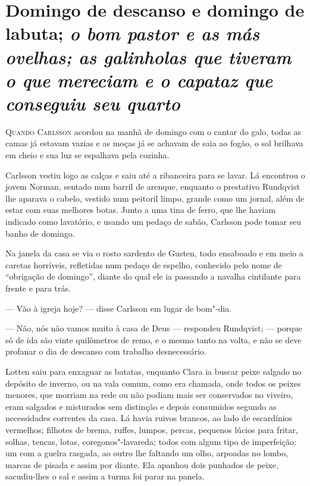 
\chapter[Domingo de descanso e domingo de labuta\ldots]{Domingo de descanso e domingo de labuta; \emph{o bom pastor e as más ovelhas; as galinholas que tiveram o que mereciam e o capataz que conseguiu seu quarto}} 

\textsc{Quando Carlsson} acordou na manhã de domingo com o cantar do galo, todas
as camas já estavam vazias e as moças já se achavam de saia ao fogão, o sol
brilhava em cheio e sua luz se espalhava pela cozinha.

Carlsson vestiu logo as calças e saiu até a ribanceira para se lavar. Lá
encontrou o jovem Norman, sentado num barril de arenque, enquanto o prestativo
Rundqvist lhe aparava o cabelo, vestido num peitoril limpo, grande como um
jornal, além de estar com suas melhores botas. Junto a uma tina de ferro, que
lhe haviam indicado como lavatório, e usando um pedaço de sabão, Carlsson
pode tomar seu banho de domingo.

Na janela da casa se via o rosto sardento de Gusten, todo ensaboado e em meio a
caretas horríveis, refletidas num pedaço de espelho, conhecido pelo nome de
``obrigação de domingo'', diante do qual ele ia passando a navalha cintilante
para frente e para trás.

--- Vão à igreja hoje? --- disse Carlsson em lugar de bom"-dia.

--- Não, nós não vamos muito à casa de Deus --- respondeu Rundqvist; --- porque só
de ida são vinte quilômetros de remo, e o mesmo tanto na volta, e não se deve
profanar o dia de descanso com trabalho desnecessário.

Lotten saiu para enxaguar as batatas, enquanto Clara ia buscar peixe salgado
no depósito de inverno, ou na vala comum, como era chamada, onde todos
os peixes menores, que morriam na rede ou não podiam mais ser conservados no
viveiro, eram salgados e misturados sem distinção e depois consumidos segundo as
necessidades correntes da casa. Lá havia ruivos brancos, ao lado de escardínios
vermelhos; filhotes de brema, ruffes, lumpos, percas, pequenos lúcios para
fritar, solhas, tencas, lotas, coregonos"-lavareda; todos com algum tipo de
imperfeição: um com a guelra rasgada, ao outro lhe faltando um olho, arpoadas no
lombo, marcas de pisada e assim por diante. Ela apanhou dois punhados de peixe,
sacudiu-lhes o sal e assim a turma foi parar na panela.

